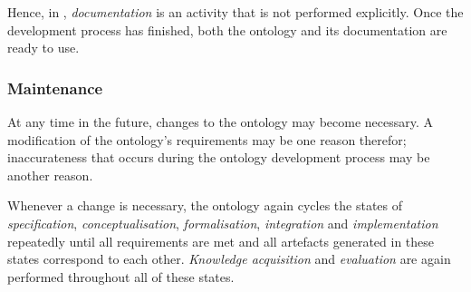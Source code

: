 Hence, in \methontology, \emph{documentation} is an activity that is not performed explicitly. Once the development process has finished, both the ontology and its documentation are ready to use. 

\subsubsection{Maintenance}

At any time in the future, changes to the ontology may become necessary. A modification of the ontology's requirements may be one reason therefor; inaccurateness that occurs during the ontology development process may be another reason.

Whenever a change is necessary, the ontology again cycles the states of \emph{specification}, \emph{conceptualisation}, \emph{formalisation}, \emph{integration} and \emph{implementation} repeatedly until all requirements are met and all artefacts generated in these states correspond to each other. \emph{Knowledge acquisition} and \emph{evaluation} are again performed throughout all of these states.

